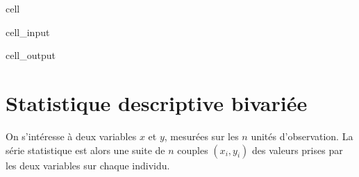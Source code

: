 \documentclass[letterpaper,10pt,english]{jupyterBook}
\begin{document}
\begin{sphinxuseclass}{cell}
\begin{sphinxVerbatimInput}
\begin{sphinxuseclass}{cell_input}
\begin{sphinxVerbatim}[commandchars=\\\{\}]
      
              \PYG{p}{[}\PYG{p}{]}\PYG{p}{[}\PYG{p}{]}
        
             
\end{sphinxVerbatim}

\end{sphinxuseclass}\end{sphinxVerbatimInput}
\begin{sphinxVerbatimOutput}

\begin{sphinxuseclass}{cell_output}
\noindent{}

\end{sphinxuseclass}\end{sphinxVerbatimOutput}

\end{sphinxuseclass}

\section{Statistique descriptive bivariée}
\label{\detokenize{statsdescriptives:statistique-descriptive-bivariee}}
\sphinxAtStartPar
On s’intéresse à deux variables \(x\) et \(y\), mesurées sur les \(n\) unités d’observation. La série statistique est alors une suite de \(n\) couples \((x_i,y_i)\) des valeurs prises par les deux variables sur chaque individu.
\end{document}
